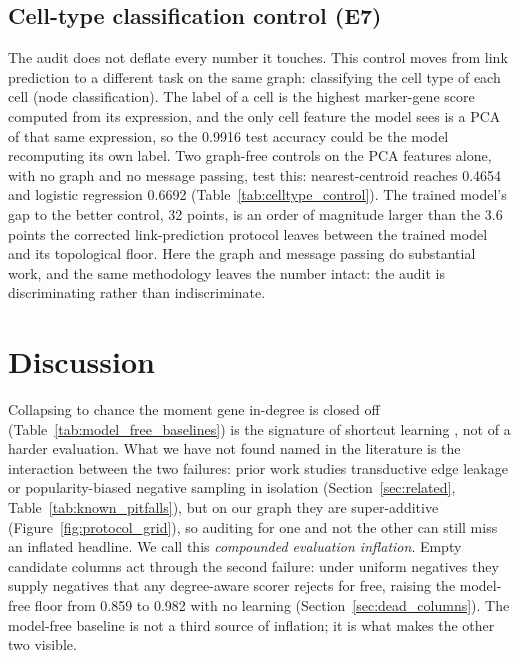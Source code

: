 \documentclass[review]{elsarticle}
\begin{document}
\subsection{Cell-type classification control (E7)}
\label{sec:celltype}
The audit does not deflate every number it touches. This control moves from link prediction to a
different task on the same graph: classifying the cell type of each cell (node classification). The
label of a cell is the highest marker-gene score computed from its expression, and the only cell
feature the model sees is a PCA of that same expression, so the 0.9916 test accuracy could
be the model recomputing its own label. Two graph-free controls on the PCA features alone, with no
graph and no message passing, test this: nearest-centroid reaches 0.4654 and logistic regression
0.6692 (Table~\ref{tab:celltype_control}). The trained model's gap to the better control, 32 points,
is an order of magnitude larger than the 3.6 points the corrected link-prediction protocol leaves
between the trained model and its topological floor. Here the graph and message passing do
substantial work, and the same methodology leaves the number intact: the audit is
discriminating rather than indiscriminate.



\section{Discussion}
\label{sec:discussion}

Collapsing to chance the moment gene in-degree is closed off (Table~\ref{tab:model_free_baselines}) is the
signature of shortcut learning \cite{geirhos2020shortcut}, not of a harder evaluation. What we have not found
named in the literature is the interaction between the two failures: prior work studies transductive edge leakage
or popularity-biased negative sampling in isolation (Section~\ref{sec:related}, Table~\ref{tab:known_pitfalls}),
but on our graph they are super-additive (Figure~\ref{fig:protocol_grid}), so auditing for one and not the other
can still miss an inflated headline. We call this \emph{compounded evaluation inflation}. Empty candidate
columns act through the second failure: under uniform negatives they supply negatives that any degree-aware
scorer rejects for free, raising the model-free floor from 0.859 to 0.982 with no learning
(Section~\ref{sec:dead_columns}). The model-free baseline is not a third source of inflation; it is what makes
the other two visible.
\end{document}
